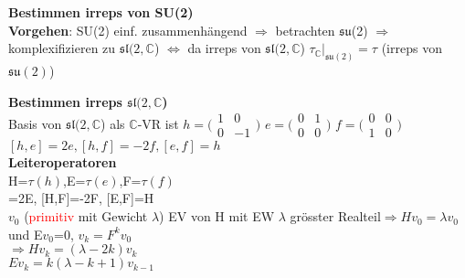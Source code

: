 \documentclass[8pt, a4paper, landscape]{extarticle}
\newcommand{\tit}[1]{\textbf{#1} \\}
\newcommand{\re}[1]{\textcolor{red}{#1}}
\newcommand{\eck}[1]{\mathfrak{#1}}
\begin{document}
\begin{multicols*}{5}
\begin{ibox}
\end{ibox}

\begin{ibox}
    \tit{Bestimmen irreps von SU(2)}
    \textbf{Vorgehen}: SU(2) einf. zusammenhängend\textcolor{green}{\smiley} $\Rightarrow$ betrachten $\eck{su}$(2) $\Rightarrow$ komplexifizieren zu $\eck{sl}(2,\mathbb{C}$) $\Leftrightarrow$ da irreps von $\eck{sl}(2,\mathbb{C}$) $\tau_\mathbb{C}|_{\eck{su}(2)}=\tau$ (irreps von $\eck{su}(2)$)
\end{ibox}

\begin{ibox}
    \tit{Bestimmen irreps $\eck{sl}(2,\mathbb{C}$)}
    \textbullet Basis von $\eck{sl}(2,\mathbb{C}$) als $\mathbb{C}$-VR ist 
    $h=\big(\begin{smallmatrix}
    1 & 0\\
    0 & -1
    \end{smallmatrix}\big)$ $e = \big(\begin{smallmatrix}
    0 & 1\\
    0 & 0
    \end{smallmatrix}\big)$ $f=\big(\begin{smallmatrix}
    0 & 0\\
    1 & 0
    \end{smallmatrix}\big)$\\
    $[h,e]=2e, [h,f]=-2f, [e,f]=h$ \\
    \tit{Leiteroperatoren}
    \textbullet H=$\tau(h)$,E=$\tau(e)$,F=$\tau(f)$\\
    \textbullet [H,E]=2E, [H,F]=-2F, [E,F]=H\\
    \textbullet $v_0$ (\re{primitiv} mit Gewicht $\lambda$) EV von H mit EW $\lambda$ grösster Realteil$\Rightarrow Hv_0=\lambda v_0$ und E$v_0$=0, $v_k=F^kv_0$\\
    $\Rightarrow H v_k=(\lambda-2k)v_k$\\$E v_k=k(\lambda -k + 1)v_{k-1}$\\
\end{ibox}


\end{multicols*}
\end{document}

